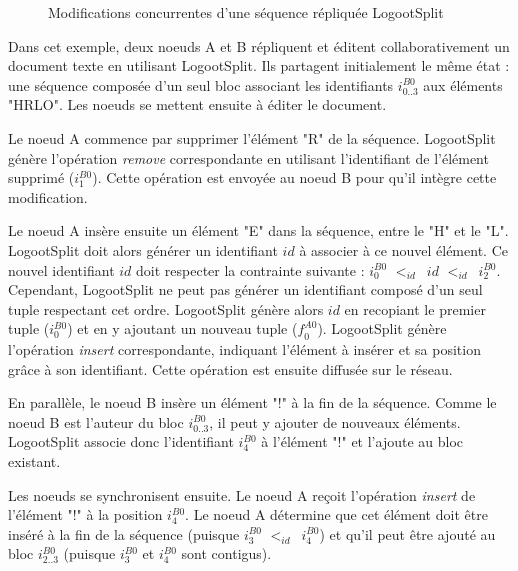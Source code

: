 \documentclass[12pt]{thesul}
\newcommand{\trm}[1]{\mathit{#1}}
\newcommand{\id}[3]{$\trm{#1}^{\trm{#2}}_{\trm{#3}}$}
\newcommand{\lid}{$<_{id}$~}
\begin{document}
\begin{figure}[!ht]
{\begin{tikzpicture}

    \end{tikzpicture}
  }
  \caption{Modifications concurrentes d'une séquence répliquée LogootSplit}
  \label{fig:logootsplit-example}
\end{figure}

Dans cet exemple, deux noeuds A et B répliquent et éditent collaborativement un document texte en utilisant LogootSplit.
Ils partagent initialement le même état : une séquence composée d'un seul bloc associant les identifiants \id{i}{B0}{0..3} aux éléments "HRLO".
Les noeuds se mettent ensuite à éditer le document.

Le noeud A commence par supprimer l'élément "R" de la séquence.
LogootSplit génère l'opération \emph{remove} correspondante en utilisant l'identifiant de l'élément supprimé (\id{i}{B0}{1}).
Cette opération est envoyée au noeud B pour qu'il intègre cette modification.

Le noeud A insère ensuite un élément "E" dans la séquence, entre le "H" et le "L".
LogootSplit doit alors générer un identifiant $id$ à associer à ce nouvel élément.
Ce nouvel identifiant $id$ doit respecter la contrainte suivante : \id{i}{B0}{0} \lid $id$ \lid \id{i}{B0}{2}.
Cependant, LogootSplit ne peut pas générer un identifiant composé d'un seul tuple respectant cet ordre.
LogootSplit génère alors $id$ en recopiant le premier tuple (\id{i}{B0}{0}) et en y ajoutant un nouveau tuple (\id{f}{A0}{0}).
LogootSplit génère l'opération \emph{insert} correspondante, indiquant l'élément à insérer et sa position grâce à son identifiant.
Cette opération est ensuite diffusée sur le réseau.

En parallèle, le noeud B insère un élément "!" à la fin de la séquence.
Comme le noeud B est l'auteur du bloc \id{i}{B0}{0..3}, il peut y ajouter de nouveaux éléments.
LogootSplit associe donc l'identifiant \id{i}{B0}{4} à l'élément "!" et l'ajoute au bloc existant.

Les noeuds se synchronisent ensuite.
Le noeud A reçoit l'opération \emph{insert} de l'élément "!" à la position \id{i}{B0}{4}.
Le noeud A détermine que cet élément doit être inséré à la fin de la séquence (puisque \id{i}{B0}{3} \lid \id{i}{B0}{4}) et qu'il peut être ajouté au bloc \id{i}{B0}{2..3} (puisque \id{i}{B0}{3} et \id{i}{B0}{4} sont contigus).
\end{document}
